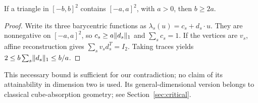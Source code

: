 \begin{lemma}
\label{lem:square-trace}
If a triangle in $[-b,b]^2$ contains $[-a,a]^2$, with $a>0$, then
$b\ge2a$.
\end{lemma}
\begin{proof}
Write its three barycentric functions as $\lambda_s(u)=c_s+d_s\cdot u$.
They are nonnegative on $[-a,a]^2$, so $c_s\ge a\lVert d_s\rVert_1$ and
$\sum_sc_s=1$. If the vertices are $v_s$, affine reconstruction gives
$\sum_s v_sd_s^T=I_2$. Taking traces yields
$2\le b\sum_s\lVert d_s\rVert_1\le b/a$.
\end{proof}
This necessary bound is sufficient for our contradiction; no claim of
its attainability in dimension two is used. Its general-dimensional
version belongs to classical cube-absorption geometry; see
Section~\ref{sec:critical}.

